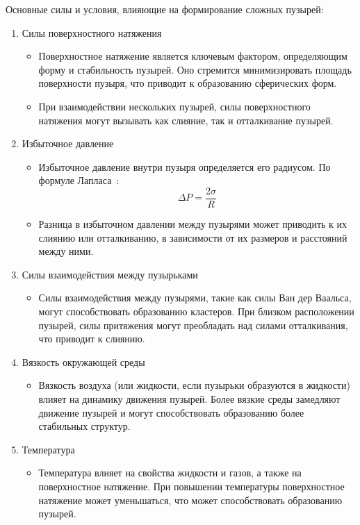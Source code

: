 Основные силы и условия, влияющие на формирование сложных пузырей:
\begin{enumerate}[label={\arabic*.}]
	\item Силы поверхностного натяжения
	\begin{itemize}	
		\item Поверхностное натяжение является ключевым фактором, определяющим форму и стабильность пузырей. Оно стремится минимизировать площадь поверхности пузыря, что приводит к образованию сферических форм.
		\item При взаимодействии нескольких пузырей, силы поверхностного натяжения могут вызывать как слияние, так и отталкивание пузырей.
	\end{itemize}
	\item Избыточное давление
	\begin{itemize}	
		\item Избыточное давление внутри пузыря определяется его радиусом. По формуле Лапласа~\cite{laplace}: \[ \Delta P = \frac{2\sigma}{R} \]
		\item Разница в избыточном давлении между пузырями может приводить к их слиянию или отталкиванию, в зависимости от их размеров и расстояний между ними.
	\end{itemize}
	\item Силы взаимодействия между пузырьками
	\begin{itemize}	
		\item Силы взаимодействия между пузырями, такие как силы Ван дер Ваальса, могут способствовать образованию кластеров. При близком расположении пузырей, силы притяжения могут преобладать над силами отталкивания, что приводит к слиянию.
	\end{itemize}
	\item Вязкость окружающей среды
	\begin{itemize}	
		\item Вязкость воздуха (или жидкости, если пузырьки образуются в жидкости) влияет на динамику движения пузырей. Более вязкие среды замедляют движение пузырей и могут способствовать образованию более стабильных структур.
	\end{itemize}
	\item Температура
	\begin{itemize}	
		\item Температура влияет на свойства жидкости и газов, а также на поверхностное натяжение. При повышении температуры поверхностное натяжение может уменьшаться, что может способствовать образованию пузырей.
	\end{itemize}

\end{enumerate}
